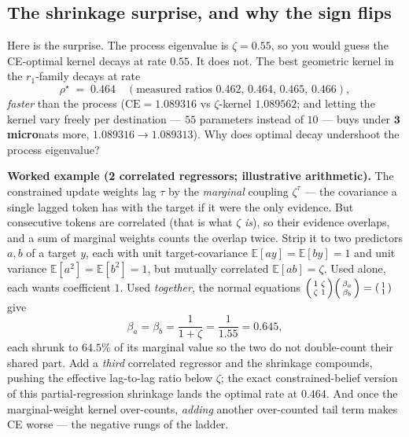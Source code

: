 \documentclass[11pt]{article}
\newcommand{\pzeta}{\zeta}
\newcommand{\pE}{\mathbb{E}}
\newcommand{\rone}{r_1}
\newcommand{\ceword}{\mathrm{CE}}
\begin{document}
\subsection{The shrinkage surprise, and why the sign flips}

Here is the surprise. The process eigenvalue is $\pzeta=0.55$, so you would
guess the CE-optimal kernel decays at rate $0.55$. It does not. The best
geometric kernel in the $\rone$-family decays at rate
\[
  \rho^\star \;=\; 0.464 \quad(\text{measured ratios } 0.462,\,0.464,\,0.465,\,0.466),
\]
\emph{faster} than the process ($\ceword=1.089316$ vs $\pzeta$-kernel
$1.089562$; and letting the kernel vary freely per destination --- $55$
parameters instead of $10$ --- buys under $\mathbf{3}$ \textbf{micro}nats more,
$1.089316\!\to\!1.089313$). Why does optimal decay undershoot the process
eigenvalue?

\textbf{Worked example (2 correlated regressors; illustrative arithmetic).}
The constrained update weights lag $\tau$ by the \emph{marginal} coupling
$\pzeta^{\tau}$ --- the covariance a single lagged token has with the target if
it were the only evidence. But consecutive tokens are correlated (that is what
$\pzeta$ \emph{is}), so their evidence overlaps, and a sum of marginal weights
counts the overlap twice. Strip it to two predictors $a,b$ of a target $y$,
each with unit target-covariance $\pE[ay]=\pE[by]=1$ and unit variance
$\pE[a^2]=\pE[b^2]=1$, but mutually correlated $\pE[ab]=\pzeta$. Used alone,
each wants coefficient $1$. Used \emph{together}, the normal equations
$\begin{psmallmatrix}1&\pzeta\\\pzeta&1\end{psmallmatrix}
\begin{psmallmatrix}\beta_a\\\beta_b\end{psmallmatrix}=
\begin{psmallmatrix}1\\1\end{psmallmatrix}$ give
\[
  \beta_a=\beta_b=\frac{1}{1+\pzeta}=\frac{1}{1.55}=0.645 ,
\]
each shrunk to $64.5\%$ of its marginal value so the two do not double-count
their shared part. Add a \emph{third} correlated regressor and the shrinkage
compounds, pushing the effective lag-to-lag ratio below $\pzeta$; the exact
constrained-belief version of this partial-regression shrinkage lands the
optimal rate at $0.464$. And once the marginal-weight kernel over-counts,
\emph{adding} another over-counted tail term makes CE worse --- the negative
rungs of the ladder.
\end{document}
